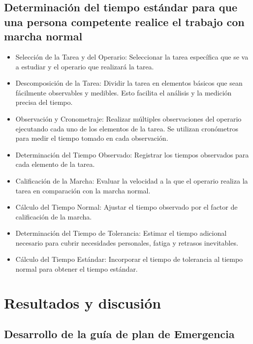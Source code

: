     \subsection{Determinación del tiempo estándar para que una persona competente realice el trabajo con marcha normal}
    
    \begin{itemize}
    \item Selección de la Tarea y del Operario: Seleccionar la tarea específica que se va a estudiar y el operario que realizará la tarea.
    \item Descomposición de la Tarea: Dividir la tarea en elementos básicos que sean fácilmente observables y medibles. Esto facilita el análisis y la medición precisa del tiempo.
    \item Observación y Cronometraje: Realizar múltiples observaciones del operario ejecutando cada uno de los elementos de la tarea. Se utilizan cronómetros para medir el tiempo tomado en cada observación.
    \item Determinación del Tiempo Observado: Registrar los tiempos observados para cada elemento de la tarea.
    \item Calificación de la Marcha: Evaluar la velocidad a la que el operario realiza la tarea en comparación con la marcha normal.
    \item Cálculo del Tiempo Normal: Ajustar el tiempo observado por el factor de calificación de la marcha.
    \item Determinación del Tiempo de Tolerancia: Estimar el tiempo adicional necesario para cubrir necesidades personales, fatiga y retrasos inevitables.
    \item Cálculo del Tiempo Estándar: Incorporar el tiempo de tolerancia al tiempo normal para obtener el tiempo estándar. 
    \end{itemize} 
    \section{Resultados y discusión}
    
    \subsection{Desarrollo de la guía de plan de Emergencia}
    
